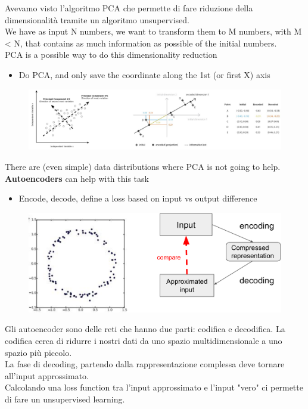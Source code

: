 Avevamo visto l'algoritmo PCA che permette di fare riduzione della dimensionalità tramite un algoritmo unsupervised.\\

We have as input N numbers, we want to transform them to M numbers, with M < N, that contains as much information as possible of the initial numbers.\\

PCA is a possible way to do this dimensionality reduction
\begin{itemize}
	\item Do PCA, and only save the coordinate along the 1st (or first X) axis
\end{itemize}

\begin{figure}[ht]
	\centering
	\includegraphics[width=1\linewidth]{figure_ml/dim_reduction.png}
\end{figure}
\FloatBarrier

There are (even simple) data distributions where PCA is not going to help.\\
\textbf{Autoencoders} can help with this task
\begin{itemize}
	\item Encode, decode, define a loss based on input vs output difference
\end{itemize}

\begin{figure}[ht]
	\centering
	\includegraphics[width=0.65\linewidth]{figure_ml/autoencoder.png}
\end{figure}
\FloatBarrier

Gli autoencoder sono delle reti che hanno due parti: codifica e decodifica. La codifica cerca di ridurre i nostri dati da uno spazio multidimensionale a uno spazio più piccolo.\\ La fase di decoding, partendo dalla rappresentazione complessa deve tornare all'input approssimato.\\
Calcolando una loss function tra l'input approssimato e l'input "vero" ci permette di fare un unsupervised learning.


